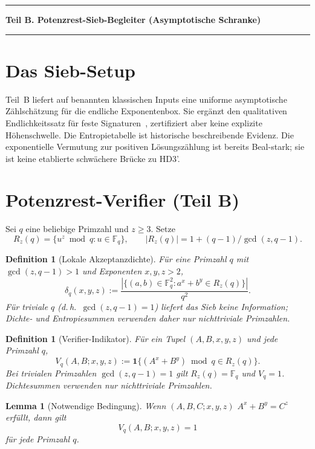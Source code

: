\documentclass[11pt,a4paper]{article}
\newtheorem{lemma}[theorem]{Lemma}
\newtheorem{definition}[theorem]{Definition}
\begin{document}
\bigskip\hrule\medskip
\begin{center}
\textbf{Teil B. Potenzrest-Sieb-Begleiter (Asymptotische Schranke)}
\end{center}
\medskip\hrule\bigskip

\section{Das Sieb-Setup}
\label{sec:weilinput}

Teil~B liefert auf benannten klassischen Inputs eine uniforme
asymptotische Zählschätzung für die endliche Exponentenbox.
Sie ergänzt den qualitativen Endlichkeitssatz für feste Signaturen~\cite{DarmonGranville1995},
zertifiziert aber keine explizite
Höhenschwelle. Die Entropietabelle ist historische beschreibende
Evidenz. Die exponentielle Vermutung zur positiven Lösungszählung
ist bereits Beal-stark; sie ist keine etablierte schwächere Brücke
zu HD3'.

\section{Potenzrest-Verifier (Teil B)}

Sei $q$ eine beliebige Primzahl und $z \ge 3$. Setze
\[
  R_z(q) = \{u^z \bmod q : u \in \mathbb{F}_q\},
  \qquad
  |R_z(q)| = 1 + (q-1)/\gcd(z,q-1).
\]

\begin{definition}[Lokale Akzeptanzdichte]
\label{def:delta}
Für eine Primzahl $q$ mit $\gcd(z,q-1)>1$ und Exponenten $x,y,z>2$,
\[
  \delta_q(x,y,z) :=
    \frac{|\{(a,b)\in \mathbb{F}_q^2 : a^x+b^y \in R_z(q)\}|}{q^2}.
\]
Für triviale $q$ (d.\,h.\ $\gcd(z,q-1)=1$) liefert das Sieb keine Information; Dichte- und Entropiesummen verwenden daher nur nichttriviale Primzahlen.
\end{definition}

\begin{definition}[Verifier-Indikator]
\label{def:Vq}
Für ein Tupel $(A,B,x,y,z)$ und jede Primzahl $q$,
\[
  V_q(A,B;x,y,z) :=
    \mathbf{1}\bigl\{(A^x+B^y) \bmod q \in R_z(q)\bigr\}.
\]
Bei trivialen Primzahlen $\gcd(z,q-1)=1$ gilt
$R_z(q)=\mathbb F_q$ und $V_q=1$. Dichtesummen verwenden nur
nichttriviale Primzahlen.
\end{definition}

\begin{lemma}[Notwendige Bedingung]
\label{lem:necessary}
Wenn $(A,B,C;x,y,z)$ $A^x+B^y=C^z$ erfüllt, dann gilt
\[
  V_q(A,B;x,y,z)=1
\]
für jede Primzahl $q$.
\end{lemma}
\end{document}
